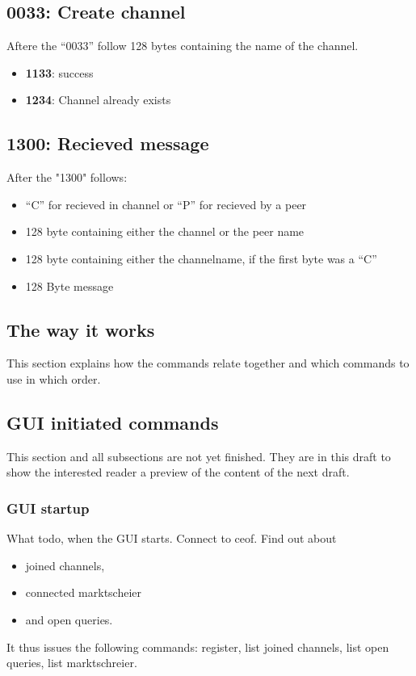 \documentclass[12pt,a4paper]{book}
\begin{document}
\subsection{0033: Create channel}
Aftere the "`0033"' follow 128 bytes containing the name of the channel.
\begin{itemize}
\item \textbf{1133}: success
\item \textbf{1234}: Channel already exists
\end{itemize}
\subsection{1300: Recieved message}
After the "1300" follows:
\begin{itemize}
\item "`C"' for recieved in channel or "`P"' for recieved by a peer
\item 128 byte containing either the channel or the peer name
\item 128 byte containing either the channelname, if the first byte was a "`C"'
\item 128 Byte message
\end{itemize}
\subsection{The way it works}
This section explains how the commands relate together and which commands to use
in which order.

\subsection{GUI initiated commands}
This section and all subsections are not yet finished. They
are in this draft to show the interested reader a preview of the
content of the next draft.
\subsubsection{GUI startup}
What todo, when the GUI starts.
Connect to ceof. Find out about
\begin{itemize}
\item joined channels,
\item connected marktscheier
\item and open queries.
\end{itemize}
It thus issues the following commands:
register, list joined channels, list open queries, list marktschreier.
\end{document}
